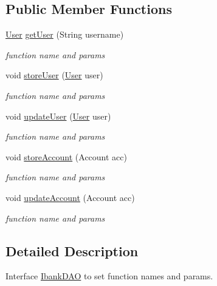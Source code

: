 \subsection*{Public Member Functions}
\begin{DoxyCompactItemize}
\item 
\hyperlink{classbankapp_1_1server_1_1User}{User} \hyperlink{interfacebankapp_1_1server_1_1IbankDAO_a11bbbf14695bce77b2932f36fdb79bd8}{get\+User} (String username)
\begin{DoxyCompactList}\small\item\em function name and params \end{DoxyCompactList}\item 
void \hyperlink{interfacebankapp_1_1server_1_1IbankDAO_a9cb41e7c04366f4ec9cfcb74d43ee37f}{store\+User} (\hyperlink{classbankapp_1_1server_1_1User}{User} user)
\begin{DoxyCompactList}\small\item\em function name and params \end{DoxyCompactList}\item 
void \hyperlink{interfacebankapp_1_1server_1_1IbankDAO_a5c38ce2000e71e9c9892bf2d357103bc}{update\+User} (\hyperlink{classbankapp_1_1server_1_1User}{User} user)
\begin{DoxyCompactList}\small\item\em function name and params \end{DoxyCompactList}\item 
void \hyperlink{interfacebankapp_1_1server_1_1IbankDAO_a6631fb11c78a48b05a743e4f7f2757ef}{store\+Account} (Account acc)
\begin{DoxyCompactList}\small\item\em function name and params \end{DoxyCompactList}\item 
void \hyperlink{interfacebankapp_1_1server_1_1IbankDAO_a0ee7aa6b093e2695955296dd72411b0c}{update\+Account} (Account acc)
\begin{DoxyCompactList}\small\item\em function name and params \end{DoxyCompactList}\end{DoxyCompactItemize}


\subsection{Detailed Description}
Interface \hyperlink{interfacebankapp_1_1server_1_1IbankDAO}{Ibank\+D\+AO} to set function names and params. 

